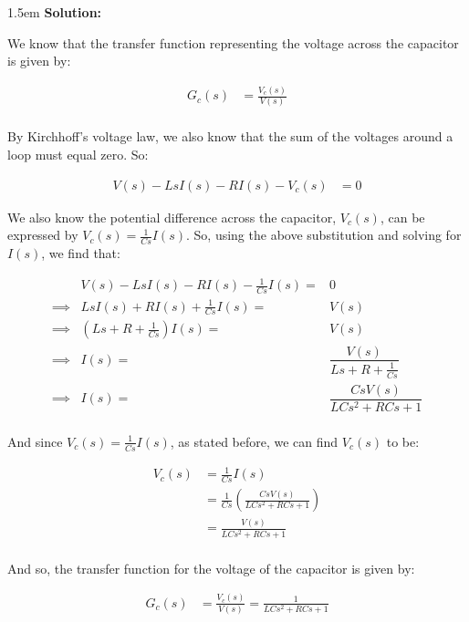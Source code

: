 \documentclass{article}
\newenvironment{solution}{
	\vspace{.5em}
	\par
	\begin{adjustwidth}{1.5em}{}
	\textbf{{Solution:}}
	\par
	\vspace{.5em}
}{
	\vspace{1em}
	\end{adjustwidth}
}
\begin{document}
\begin{solution}
	We know that the transfer function representing the voltage across the capacitor is given by:

	\begin{align*}
		G_c(s) &= \frac{V_c(s)}{V(s)} \\
	\end{align*}

	By Kirchhoff's voltage law, we also know that the sum of the voltages around a loop must equal zero. So:

	\begin{align*}
		V(s) - LsI(s) - RI(s) - V_c(s) &= 0
	\end{align*}

	We also know the potential difference across the capacitor, $V_c(s)$, can be expressed by $V_c(s) = \frac{1}{Cs} I(s)$. So, using the above substitution and solving for $I(s)$, we find that:

	\begin{equation*}
		\begin{array}{lrl}
			& V(s) - LsI(s) - RI(s) - \tfrac{1}{Cs} I(s) =& 0 \\
			\implies & LsI(s) + RI(s) + \tfrac{1}{Cs} I(s) =& V(s) \\
			\implies & \left( Ls + R + \tfrac{1}{Cs} \right) I(s) =& V(s) \\
			\implies & I(s) =& \dfrac{V(s)}{Ls + R + \frac{1}{Cs}} \\
			\implies & I(s) =& \dfrac{Cs V(s)}{LCs^2 + RCs + 1} \\
		\end{array}
	\end{equation*}

	\vspace{0.5em}

	And since $V_c(s) = \frac{1}{Cs} I(s)$, as stated before, we can find $V_c(s)$ to be:

	\begin{align*}
		V_c(s) &= \tfrac{1}{Cs} I(s) \\
			&= \tfrac{1}{Cs} \left( \frac{Cs V(s)}{LCs^2 + RCs + 1} \right) \\
			&= \frac{V(s)}{LCs^2 + RCs + 1} \\
	\end{align*}

	And so, the transfer function for the voltage of the capacitor is given by:

	\begin{align*}
		G_c(s) &= \frac{V_c(s)}{V(s)} = \frac{1}{LCs^2 + RCs + 1} \\
	\end{align*}
\end{solution}
\end{document}

